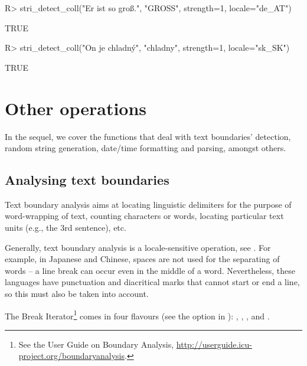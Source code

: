 \documentclass[nojss]{jss}\usepackage[]{graphicx}\usepackage[]{color}
\begin{document}
\begin{Schunk}
\begin{Sinput}
R> stri_detect_coll("Er ist so groß.", "GROSS", strength=1, locale="de_AT")
\end{Sinput}
\begin{Soutput}
[1] TRUE
\end{Soutput}
\begin{Sinput}
R> stri_detect_coll("On je chladný", "chladny", strength=1, locale="sk_SK")
\end{Sinput}
\begin{Soutput}
[1] TRUE
\end{Soutput}
\end{Schunk}





\section{Other operations}\label{Sec:other}

In the sequel, we cover the functions that deal with
text boundaries' detection, random string generation,
date/time formatting and parsing, amongst others.


\subsection{Analysing text boundaries}\label{Sec:BoundaryAnalysis}

Text boundary analysis aims at locating linguistic delimiters
for the purpose of word-wrapping of text, counting characters or
words, locating particular text units (e.g.,
the 3rd sentence), etc.

Generally, text boundary analysis is a locale-sensitive operation,
see \citep{usa29:segmentation}.
For example, in Japanese and Chinese, spaces are not used for
the separating of words --
a line break can occur even in the middle of a word. Nevertheless,
these languages have punctuation and diacritical marks that cannot
start or end a line, so this must also be taken into account.

The  Break Iterator\footnote{See the  User Guide
on {Boundary Analysis}, \url{http://userguide.icu-project.org/boundaryanalysis}.}
comes in four flavours (see the  option
in ):
, , , and .
\end{document}
